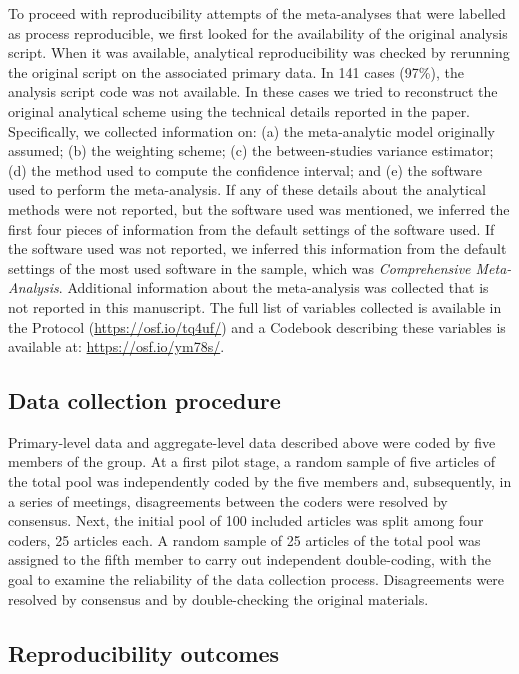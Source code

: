 \documentclass[
  ,jou, a4paper,floatsintext]{apa6}
\begin{document}
To proceed with reproducibility attempts of the meta-analyses that were labelled as process reproducible, we first looked for the availability of the original analysis script. When it was available, analytical reproducibility was checked by rerunning the original script on the associated primary data. In 141 cases (97\%), the analysis script code was not available. In these cases we tried to reconstruct the original analytical scheme using the technical details reported in the paper. Specifically, we collected information on: (a) the meta-analytic model originally assumed; (b) the weighting scheme; (c) the between-studies variance estimator; (d) the method used to compute the confidence interval; and (e) the software used to perform the meta-analysis. If any of these details about the analytical methods were not reported, but the software used was mentioned, we inferred the first four pieces of information from the default settings of the software used. If the software used was not reported, we inferred this information from the default settings of the most used software in the sample, which was \emph{Comprehensive Meta-Analysis}. Additional information about the meta-analysis was collected that is not reported in this manuscript. The full list of variables collected is available in the Protocol (\url{https://osf.io/tq4uf/}) and a Codebook describing these variables is available at: \url{https://osf.io/ym78s/}.

\hypertarget{data-collection-procedure}{%
\subsection{Data collection procedure}\label{data-collection-procedure}}

Primary-level data and aggregate-level data described above were coded by five members of the group. At a first pilot stage, a random sample of five articles of the total pool was independently coded by the five members and, subsequently, in a series of meetings, disagreements between the coders were resolved by consensus. Next, the initial pool of 100 included articles was split among four coders, 25 articles each. A random sample of 25 articles of the total pool was assigned to the fifth member to carry out independent double-coding, with the goal to examine the reliability of the data collection process. Disagreements were resolved by consensus and by double-checking the original materials.

\hypertarget{reproducibility-outcomes}{%
\subsection{Reproducibility outcomes}\label{reproducibility-outcomes}}
\end{document}
